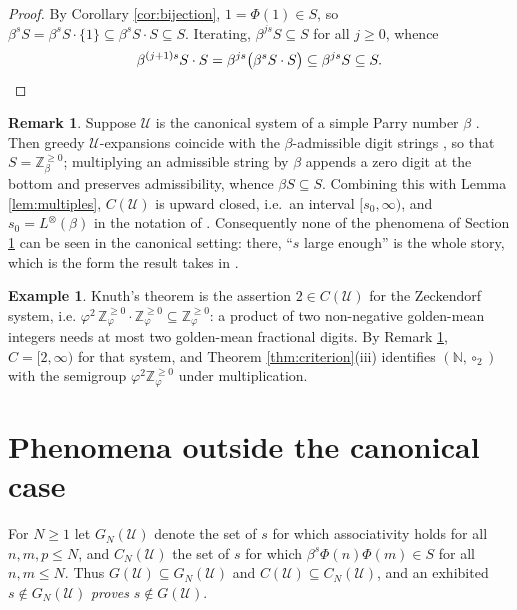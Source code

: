 \documentclass[11pt,reqno]{amsart}
\theoremstyle{plain}
\theoremstyle{definition}
\newtheorem{remark}[theorem]{Remark}
\newtheorem{example}[theorem]{Example}
\newcommand{\Z}{\mathbb{Z}}
\newcommand{\N}{\mathbb{N}}
\newcommand{\Uu}{\mathcal{U}}
\begin{document}
\begin{proof}
By Corollary \ref{cor:bijection}, $1=\Phi(1)\in S$, so
$\beta^{s}S=\beta^{s}S\cdot\{1\}\subseteq\beta^{s}S\cdot S\subseteq S$. Iterating,
$\beta^{js}S\subseteq S$ for all $j\ge0$, whence
\[
  \beta^{(j+1)s}S\cdot S=\beta^{js}\bigl(\beta^{s}S\cdot S\bigr)\subseteq\beta^{js}S\subseteq S. \qedhere
\]
\end{proof}

\begin{remark}\label{rem:canonical}
Suppose $\Uu$ is the canonical system of a simple Parry number $\beta$ \cite{Parry}. Then greedy
$\Uu$-expansions coincide with the $\beta$-admissible digit strings \cite{Bertrand}, so that
$S=\Z_{\beta}^{\ge0}$; multiplying an admissible string by $\beta$ appends a zero digit at the
bottom and preserves admissibility, whence $\beta S\subseteq S$. Combining this with
Lemma \ref{lem:multiples}, $C(\Uu)$ is upward closed, i.e.\ an interval $[s_{0},\infty)$, and
$s_{0}=L^{\otimes}(\beta)$ in the notation of \cite{BFGK,AFMP}. Consequently none of the phenomena
of Section \ref{sec:phenomena} can be seen in the canonical setting: there, ``$s$ large enough'' is
the whole story, which is the form the result takes in \cite{Grabner,Messaoudi1,Messaoudi2}.
\end{remark}

\begin{example}\label{ex:knuththeorem}
Knuth's theorem is the assertion $2\in C(\Uu)$ for the Zeckendorf system, i.e.
$\varphi^{2}\,\Z_{\varphi}^{\ge0}\!\cdot\Z_{\varphi}^{\ge0}\subseteq\Z_{\varphi}^{\ge0}$: a product
of two non-negative golden-mean integers needs at most two golden-mean fractional digits. By
Remark \ref{rem:canonical}, $C=[2,\infty)$ for that system, and Theorem \ref{thm:criterion}(iii)
identifies $(\N,\circ_{2})$ with the semigroup
$\varphi^{2}\Z_{\varphi}^{\ge0}$ under multiplication.
\end{example}

\section{Phenomena outside the canonical case}\label{sec:phenomena}

For $N\ge1$ let $G_{N}(\Uu)$ denote the set of $s$ for which associativity holds for all
$n,m,p\le N$, and $C_{N}(\Uu)$ the set of $s$ for which $\beta^{s}\Phi(n)\Phi(m)\in S$ for all
$n,m\le N$. Thus $G(\Uu)\subseteq G_{N}(\Uu)$ and $C(\Uu)\subseteq C_{N}(\Uu)$, and an exhibited
$s\notin G_{N}(\Uu)$ \emph{proves} $s\notin G(\Uu)$.
\end{document}
